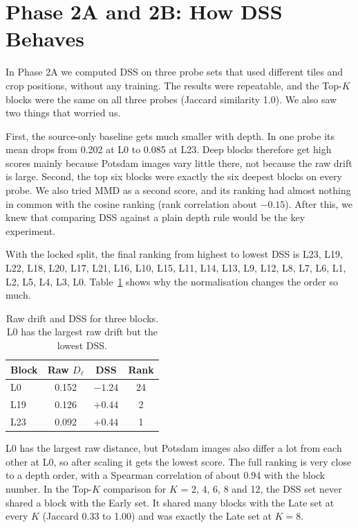 \documentclass[11pt,a4paper]{report}
\begin{document}
\section{Phase 2A and 2B: How DSS Behaves}
\label{sec:dssresults}

In Phase 2A we computed DSS on three probe sets that used different tiles and crop positions, without any training. The results were repeatable, and the Top-$K$ blocks were the same on all three probes (Jaccard similarity 1.0). We also saw two things that worried us.

First, the source-only baseline gets much smaller with depth. In one probe its mean drops from 0.202 at L0 to 0.085 at L23. Deep blocks therefore get high scores mainly because Potsdam images vary little there, not because the raw drift is large. Second, the top six blocks were exactly the six deepest blocks on every probe. We also tried MMD as a second score, and its ranking had almost nothing in common with the cosine ranking (rank correlation about $-0.15$). After this, we knew that comparing DSS against a plain depth rule would be the key experiment.

With the locked split, the final ranking from highest to lowest DSS is L23, L19, L22, L18, L20, L17, L21, L16, L10, L15, L11, L14, L13, L9, L12, L8, L7, L6, L1, L2, L5, L4, L3, L0. Table~\ref{tab:rawz} shows why the normalisation changes the order so much.

\begin{table}[t]
\centering
\caption{Raw drift and DSS for three blocks. L0 has the largest raw drift but the lowest DSS.}
\label{tab:rawz}
\small
\begin{tabular}{@{}lccc@{}}
\toprule
\textbf{Block} & \textbf{Raw $D_\ell$} & \textbf{DSS} & \textbf{Rank} \\
\midrule
L0  & 0.152 & $-1.24$ & 24 \\
L19 & 0.126 & $+0.44$ & 2 \\
L23 & 0.092 & $+0.44$ & 1 \\
\bottomrule
\end{tabular}
\end{table}

L0 has the largest raw distance, but Potsdam images also differ a lot from each other at L0, so after scaling it gets the lowest score. The full ranking is very close to a depth order, with a Spearman correlation of about 0.94 with the block number. In the Top-$K$ comparison for $K$ = 2, 4, 6, 8 and 12, the DSS set never shared a block with the Early set. It shared many blocks with the Late set at every $K$ (Jaccard 0.33 to 1.00) and was exactly the Late set at $K = 8$.
\end{document}
